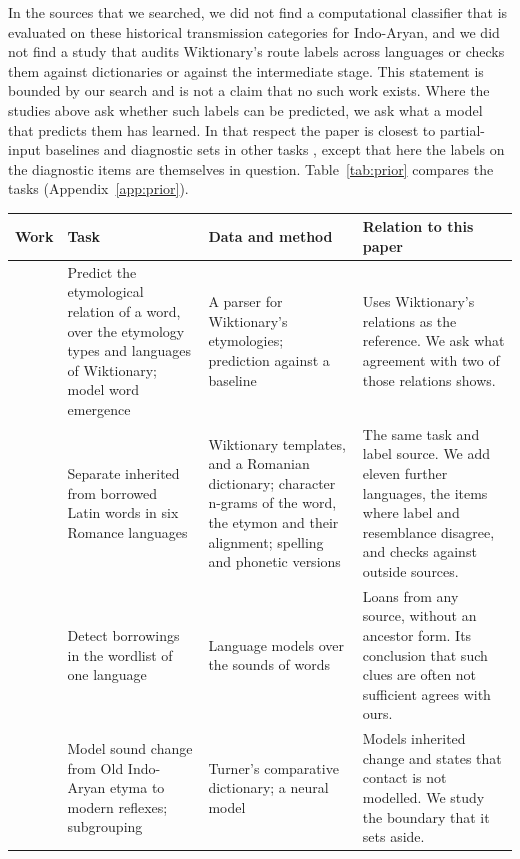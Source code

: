 \documentclass[11pt]{article}
\begin{document}
In the sources that we searched, we did not find a computational classifier that is evaluated on these historical transmission categories for Indo-Aryan, and we did not find a study that audits Wiktionary's route labels across languages or checks them against dictionaries or against the intermediate stage. This statement is bounded by our search and is not a claim that no such work exists. Where the studies above ask whether such labels can be predicted, we ask what a model that predicts them has learned. In that respect the paper is closest to partial-input baselines and diagnostic sets in other tasks \citep{poliak2018hypothesis,mccoy2019right}, except that here the labels on the diagnostic items are themselves in question. Table~\ref{tab:prior} compares the tasks (Appendix~\ref{app:prior}).

\begin{table}[t]
\centering\footnotesize
\begin{tabular}{p{}p{}p{}p{}}
\toprule
\textbf{Work} & \textbf{Task} & \textbf{Data and method} & \textbf{Relation to this paper} \\
\midrule
\citet{wu2020computational} & Predict the etymological relation of a word, over the etymology types and languages of Wiktionary; model word emergence & A parser for Wiktionary's etymologies; prediction against a baseline & Uses Wiktionary's relations as the reference. We ask what agreement with two of those relations shows. \\
\addlinespace
\citet{cristea2021inherited} & Separate inherited from borrowed Latin words in six Romance languages & Wiktionary templates, and a Romanian dictionary; character n-grams of the word, the etymon and their alignment; spelling and phonetic versions & The same task and label source. We add eleven further languages, the items where label and resemblance disagree, and checks against outside sources. \\
\addlinespace
\citet{miller2020lexical} & Detect borrowings in the wordlist of one language & Language models over the sounds of words & Loans from any source, without an ancestor form. Its conclusion that such clues are often not sufficient agrees with ours. \\
\addlinespace
\citet{cathcart2020disentangling} & Model sound change from Old Indo-Aryan etyma to modern reflexes; subgrouping & Turner's comparative dictionary; a neural model & Models inherited change and states that contact is not modelled. We study the boundary that it sets aside. \\

\end{tabular}
\end{table}
\end{document}
